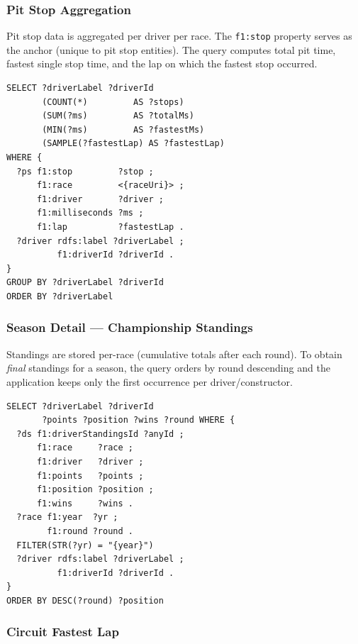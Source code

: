 \documentclass[12pt,a4paper]{article}
\begin{document}
\subsubsection{Pit Stop Aggregation}

Pit stop data is aggregated per driver per race. The \texttt{f1:stop} property
serves as the anchor (unique to pit stop entities). The query computes total pit
time, fastest single stop time, and the lap on which the fastest stop occurred.

\begin{lstlisting}[style=sparql, caption={Per-driver pit stop aggregation for a race}]
SELECT ?driverLabel ?driverId
       (COUNT(*)         AS ?stops)
       (SUM(?ms)         AS ?totalMs)
       (MIN(?ms)         AS ?fastestMs)
       (SAMPLE(?fastestLap) AS ?fastestLap)
WHERE {
  ?ps f1:stop         ?stop ;
      f1:race         <{raceUri}> ;
      f1:driver       ?driver ;
      f1:milliseconds ?ms ;
      f1:lap          ?fastestLap .
  ?driver rdfs:label ?driverLabel ;
          f1:driverId ?driverId .
}
GROUP BY ?driverLabel ?driverId
ORDER BY ?driverLabel
\end{lstlisting}

\subsubsection{Season Detail --- Championship Standings}

Standings are stored per-race (cumulative totals after each round). To obtain
\emph{final} standings for a season, the query orders by round descending and
the application keeps only the first occurrence per driver/constructor.

\begin{lstlisting}[style=sparql, caption={Driver championship standings for a season (final round)}]
SELECT ?driverLabel ?driverId
       ?points ?position ?wins ?round WHERE {
  ?ds f1:driverStandingsId ?anyId ;
      f1:race     ?race ;
      f1:driver   ?driver ;
      f1:points   ?points ;
      f1:position ?position ;
      f1:wins     ?wins .
  ?race f1:year  ?yr ;
        f1:round ?round .
  FILTER(STR(?yr) = "{year}")
  ?driver rdfs:label ?driverLabel ;
          f1:driverId ?driverId .
}
ORDER BY DESC(?round) ?position
\end{lstlisting}

\subsubsection{Circuit Fastest Lap}
\end{document}

